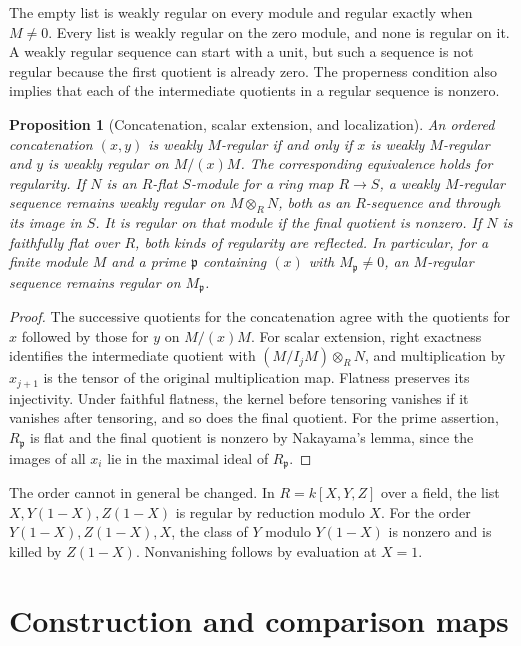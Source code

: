 \documentclass[11pt,oneside,openany]{book}
\newtheorem{proposition}[theorem]{Proposition}
\theoremstyle{definition}
\theoremstyle{remark}
\begin{document}
The empty list is weakly regular on every module and regular exactly when
$M\ne0$. Every list is weakly regular on the zero module, and none is
regular on it. A weakly regular sequence can start with a unit, but such
a sequence is not regular because the first quotient is already zero.
The properness condition also implies that each of the intermediate
quotients in a regular sequence is nonzero.

\begin{proposition}[Concatenation, scalar extension, and localization]
\label{res:RK-02}
An ordered concatenation $(x,y)$ is weakly $M$-regular if and only if $x$
is weakly $M$-regular and $y$ is weakly regular on $M/(x)M$. The corresponding
equivalence holds for regularity. If $N$ is an $R$-flat $S$-module for a ring
map $R\to S$, a weakly $M$-regular sequence remains weakly regular on
$M\otimes_R N$, both as an $R$-sequence and through its image in $S$. It is
regular on that module if the final quotient is nonzero. If $N$ is faithfully
flat over $R$, both kinds of regularity are reflected. In particular, for a
finite module $M$ and a prime $\mathfrak p$ containing $(x)$ with
$M_{\mathfrak p}\ne0$, an $M$-regular sequence remains regular on
$M_{\mathfrak p}$.
\end{proposition}
\begin{proof}
The successive quotients for the concatenation agree with the quotients
for $x$ followed by those for $y$ on $M/(x)M$.
For scalar extension, right exactness identifies the intermediate
quotient with $(M/I_jM)\otimes_R N$, and multiplication by $x_{j+1}$
is the tensor of the original multiplication map. Flatness preserves
its injectivity. Under faithful flatness, the kernel before tensoring
vanishes if it vanishes after tensoring, and so does the final quotient.
For the prime assertion, $R_{\mathfrak p}$ is flat and the final
quotient is nonzero by Nakayama's lemma, since the images of all $x_i$
lie in the maximal ideal of $R_{\mathfrak p}$.
\end{proof}

The order cannot in general be changed. In $R=k[X,Y,Z]$ over a field, the
list $X,Y(1-X),Z(1-X)$ is regular by reduction modulo $X$. For the order
$Y(1-X),Z(1-X),X$, the class of $Y$ modulo $Y(1-X)$ is nonzero and is
killed by $Z(1-X)$. Nonvanishing follows by evaluation at $X=1$.

\section{Construction and comparison maps}
\end{document}
